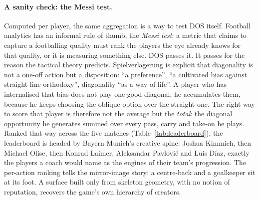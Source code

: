 \documentclass[11pt]{article}
\begin{document}
\paragraph{A sanity check: the Messi test.} Computed per player, the
same aggregation is a way to test DOS itself. Football analytics has an
informal rule of thumb, the \emph{Messi test}: a metric that claims to
capture a footballing quality must rank the players the eye already knows
for that quality, or it is measuring something else. DOS passes it. It
passes for the reason the tactical theory predicts. Spielverlagerung is
explicit that diagonality is not a one-off action but a disposition: ``a
preference'', ``a cultivated bias against straight-line orthodoxy'',
diagonality ``as a way of life''. A player who has internalised that bias
does not play one good diagonal; he accumulates them, because he keeps
choosing the oblique option over the straight one. The right way to score
that player is therefore not the average but the \emph{total}: the
diagonal opportunity he generates summed over every pass, carry and
take-on he plays. Ranked that way across the five matches (Table~\ref{tab:leaderboard}), the leaderboard
is headed by Bayern Munich's creative spine: Joshua Kimmich, then Michael
Olise, then Konrad Laimer, Aleksandar Pavlovi\'c and Luis D\'iaz, exactly
the players a coach would name as the engines of their team's progression.
The per-action ranking tells the mirror-image story: a centre-back and a
goalkeeper sit at its foot. A surface built only from skeleton geometry,
with no notion of reputation, recovers the game's own hierarchy of
creators.
\end{document}
